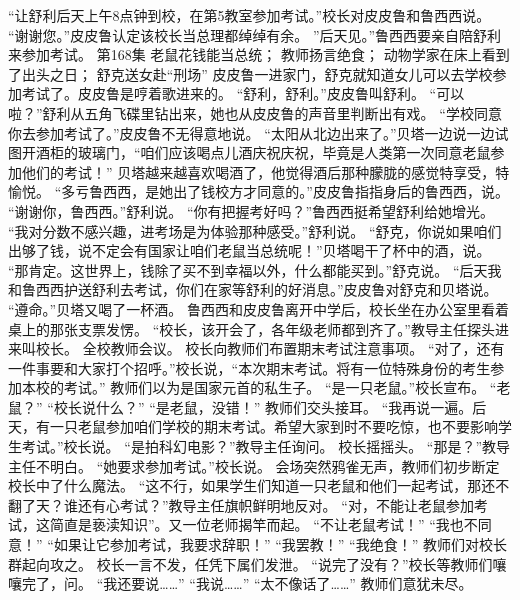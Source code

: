 \documentclass[a4paper,12pt,UTF8,twoside]{ctexbook}
\begin{document}
        “让舒利后天上午8点钟到校，在第5教室参加考试。”校长对皮皮鲁和鲁西西说。 
        “谢谢您。”皮皮鲁认定该校长当总理都绰绰有余。 
        ”后天见。”鲁西西要亲自陪舒利来参加考试。   第168集 
        老鼠花钱能当总统； 
        教师扬言绝食； 
        动物学家在床上看到了出头之日； 
        舒克送女赴“刑场”   
        皮皮鲁一进家门，舒克就知道女儿可以去学校参加考试了。皮皮鲁是哼着歌进来的。 
        “舒利，舒利。”皮皮鲁叫舒利。 
        “可以啦？”舒利从五角飞碟里钻出来，她也从皮皮鲁的声音里判断出有戏。 
        “学校同意你去参加考试了。”皮皮鲁不无得意地说。 
        “太阳从北边出来了。”贝塔一边说一边试图开酒柜的玻璃门，“咱们应该喝点儿酒庆祝庆祝，毕竟是人类第一次同意老鼠参加他们的考试！” 
        贝塔越来越喜欢喝酒了，他觉得酒后那种朦胧的感觉特享受，特愉悦。 
        “多亏鲁西西，是她出了钱校方才同意的。”皮皮鲁指指身后的鲁西西，说。 
        “谢谢你，鲁西西。”舒利说。 
        “你有把握考好吗？”鲁西西挺希望舒利给她增光。 
        “我对分数不感兴趣，进考场是为体验那种感受。”舒利说。 
        “舒克，你说如果咱们出够了钱，说不定会有国家让咱们老鼠当总统呢！”贝塔喝干了杯中的酒，说。 
        “那肯定。这世界上，钱除了买不到幸福以外，什么都能买到。”舒克说。 
        “后天我和鲁西西护送舒利去考试，你们在家等舒利的好消息。”皮皮鲁对舒克和贝塔说。 
        “遵命。”贝塔又喝了一杯酒。 
        鲁西西和皮皮鲁离开中学后，校长坐在办公室里看着桌上的那张支票发愣。 
        “校长，该开会了，各年级老师都到齐了。”教导主任探头进来叫校长。 
        全校教师会议。 
        校长向教师们布置期末考试注意事项。 
        “对了，还有一件事要和大家打个招呼。”校长说，“本次期末考试。将有一位特殊身份的考生参加本校的考试。” 
        教师们以为是国家元首的私生子。 
        “是一只老鼠。”校长宣布。 
        “老鼠？” 
        “校长说什么？” 
        “是老鼠，没错！” 
        教师们交头接耳。 
        “我再说一遍。后天，有一只老鼠参加咱们学校的期末考试。希望大家到时不要吃惊，也不要影响学生考试。”校长说。 
        “是拍科幻电影？”教导主任询问。 
        校长摇摇头。 
        “那是？”教导主任不明白。 
        “她要求参加考试。”校长说。 
        会场突然鸦雀无声，教师们初步断定校长中了什么魔法。 
        “这不行，如果学生们知道一只老鼠和他们一起考试，那还不翻了天？谁还有心考试？”教导主任旗帜鲜明地反对。 
        “对，不能让老鼠参加考试，这简直是亵渎知识”。又一位老师揭竿而起。 
        “不让老鼠考试！” 
        “我也不同意！” 
        “如果让它参加考试，我要求辞职！” 
        “我罢教！” 
        “我绝食！” 
        教师们对校长群起向攻之。 
        校长一言不发，任凭下属们发泄。 
        “说完了没有？”校长等教师们嚷嚷完了，问。 
        “我还要说……” 
        “我说……” 
        “太不像话了……” 
        教师们意犹未尽。 
\end{document}
